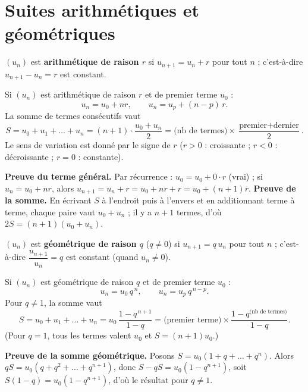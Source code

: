 \section{Suites arithmétiques et géométriques}

\begin{definition}
$(u_n)$ est \textbf{arithmétique de raison $r$} si $u_{n+1}=u_n+r$ pour tout $n$ ;
c'est-à-dire $u_{n+1}-u_n=r$ est constant.
\end{definition}

\begin{propriete}
Si $(u_n)$ est arithmétique de raison $r$ et de premier terme $u_0$ :
\[
u_n=u_0+nr,\qquad u_n=u_p+(n-p)\,r .
\]
La somme de termes consécutifs vaut
\[
S=u_0+u_1+\dots+u_n=(n+1)\cdot\frac{u_0+u_n}{2}
=\bigl(\text{nb de termes}\bigr)\times\frac{\text{premier}+\text{dernier}}{2}.
\]
Le sens de variation est donné par le signe de $r$ ($r>0$ : croissante ; $r<0$ : décroissante ;
$r=0$ : constante).
\end{propriete}

\begin{remarque}
\textbf{Preuve du terme général.} Par récurrence : $u_0=u_0+0\cdot r$ (vrai) ; si $u_n=u_0+nr$,
alors $u_{n+1}=u_n+r=u_0+nr+r=u_0+(n+1)r$. \textbf{Preuve de la somme.} En écrivant $S$
à l'endroit puis à l'envers et en additionnant terme à terme, chaque paire vaut $u_0+u_n$ ;
il y a $n+1$ termes, d'où $2S=(n+1)(u_0+u_n)$.
\end{remarque}

\begin{definition}
$(u_n)$ est \textbf{géométrique de raison $q$} ($q\neq0$) si $u_{n+1}=q\,u_n$ pour tout $n$ ;
c'est-à-dire $\dfrac{u_{n+1}}{u_n}=q$ est constant (quand $u_n\ne0$).
\end{definition}

\begin{propriete}
Si $(u_n)$ est géométrique de raison $q$ et de premier terme $u_0$ :
\[
u_n=u_0\,q^{\,n},\qquad u_n=u_p\,q^{\,n-p}.
\]
Pour $q\neq1$, la somme vaut
\[
S=u_0+u_1+\dots+u_n=u_0\,\frac{1-q^{\,n+1}}{1-q}
=\bigl(\text{premier terme}\bigr)\times\frac{1-q^{\text{(nb de termes)}}}{1-q}.
\]
(Pour $q=1$, tous les termes valent $u_0$ et $S=(n+1)u_0$.)
\end{propriete}

\begin{remarque}
\textbf{Preuve de la somme géométrique.} Posons $S=u_0(1+q+\dots+q^n)$. Alors
$qS=u_0(q+q^2+\dots+q^{n+1})$, donc $S-qS=u_0(1-q^{n+1})$, soit $S(1-q)=u_0(1-q^{n+1})$,
d'où le résultat pour $q\ne1$.
\end{remarque}

